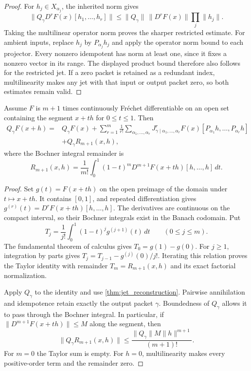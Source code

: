 \begin{proof}
For $h_j\in X_{\alpha_j}$, the inherited norm gives
\[
\|Q_\gamma D^rF(x)[h_1,\ldots,h_r]\|
\le \|Q_\gamma\|\,\|D^rF(x)\|\prod_j\|h_j\|.
\]
Taking the multilinear operator norm proves the sharper restricted estimate. For ambient inputs, replace $h_j$ by $P_{\alpha_j}h_j$ and apply the operator norm bound to each projector. Every nonzero idempotent has norm at least one, since it fixes a nonzero vector in its range. The displayed product bound therefore also follows for the restricted jet. If a zero packet is retained as a redundant index, multilinearity makes any jet with that input or output packet zero, so both estimates remain valid.
\end{proof}

\begin{corollary}\label{cor:packet_taylor}
Assume $F$ is $m+1$ times continuously Fr\'echet differentiable on an open set containing the segment $x+th$ for $0\le t\le1$.  Then
\[
\begin{aligned}
Q_\gamma F(x+h)
={}&Q_\gamma F(x)
+
\sum_{r=1}^{m}\frac1{r!}
\sum_{\alpha_1,\ldots,\alpha_r}
J^{r}_{\gamma\mid\alpha_1,\ldots,\alpha_r}F(x)
[P_{\alpha_1}h,\ldots,P_{\alpha_r}h]\\
&+Q_\gamma R_{m+1}(x,h),
\end{aligned}
\]
where the Bochner integral remainder is
\[
R_{m+1}(x,h)
=
\frac1{m!}
\int_0^1(1-t)^m
D^{m+1}F(x+th)[h,\ldots,h]\,dt.
\]
\end{corollary}

\begin{proof}
Set $g(t)=F(x+th)$ on the open preimage of the domain under $t\mapsto x+th$. It contains $[0,1]$, and repeated differentiation gives
$g^{(r)}(t)=D^rF(x+th)[h,\ldots,h]$. The derivatives are continuous on the compact interval, so their Bochner integrals exist in the Banach codomain. Put
\[
T_j=\frac1{j!}\int_0^1(1-t)^j g^{(j+1)}(t)\,dt
\qquad(0\le j\le m).
\]
The fundamental theorem of calculus gives $T_0=g(1)-g(0)$. For $j\ge1$, integration by parts gives
$T_j=T_{j-1}-g^{(j)}(0)/j!$. Iterating this relation proves the Taylor identity with remainder $T_m=R_{m+1}(x,h)$ and its exact factorial normalization.

Apply $Q_\gamma$ to the identity and use \cref{thm:jet_reconstruction}. Pairwise annihilation and idempotence retain exactly the output packet $\gamma$. Boundedness of $Q_\gamma$ allows it to pass through the Bochner integral. In particular, if
$\|D^{m+1}F(x+th)\|\le M$ along the segment, then
\[
\|Q_\gamma R_{m+1}(x,h)\|
\le \frac{\|Q_\gamma\|M\|h\|^{m+1}}{(m+1)!}.
\]
For $m=0$ the Taylor sum is empty. For $h=0$, multilinearity makes every positive-order term and the remainder zero.
\end{proof}

